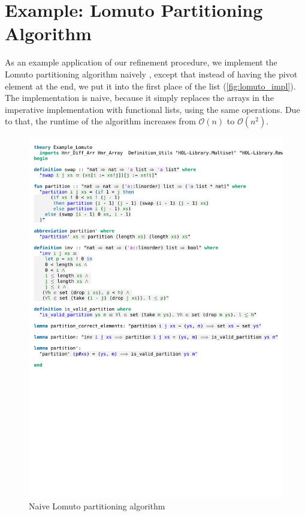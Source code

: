 \chapter{Example: Lomuto Partitioning Algorithm}\label{chapter:example}

As an example application of our refinement procedure, we implement the Lomuto partitioning algorithm naively \parencite[p.287]{bentley1984programming}, except that instead of having the pivot element at the end, we put it into the first place of the list (\autoref{fig:lomuto_impl}). The implementation is naive, because it simply replaces the arrays in the imperative implementation with functional lists, using the same operations. Due to that, the runtime of the algorithm increases from $\mathcal{O}(n)$ to $\mathcal{O}(n^2)$.

\begin{figure}[htbp]
    \includegraphics[trim={0 21cm 0 2,4cm}, clip, width=1.00\textwidth]{figures/Theory_Example_Lomuto_Impl.pdf}
    \caption[Naive Lomuto partitioning algorithm]{Naive Lomuto partitioning algorithm}
    \label{fig:lomuto_impl}
\end{figure}

